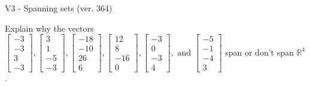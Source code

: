 \begin{exercise}
  \begin{exerciseTitle}V3 - Spanning sets (ver. 364)\end{exerciseTitle}
  \begin{exerciseStatement}
    Explain why the vectors \(\left[\begin{array}{r}
-3 \\
-3 \\
3 \\
-3
\end{array}\right] , \left[\begin{array}{r}
3 \\
1 \\
-5 \\
-3
\end{array}\right] , \left[\begin{array}{r}
-18 \\
-10 \\
26 \\
6
\end{array}\right] , \left[\begin{array}{r}
12 \\
8 \\
-16 \\
0
\end{array}\right] , \left[\begin{array}{r}
-3 \\
0 \\
-3 \\
4
\end{array}\right] , \text{ and } \left[\begin{array}{r}
-5 \\
-1 \\
-4 \\
3
\end{array}\right]\) span or don't span \(\mathbb{R}^4\). 
	



\end{exerciseStatement}
\end{exercise}
